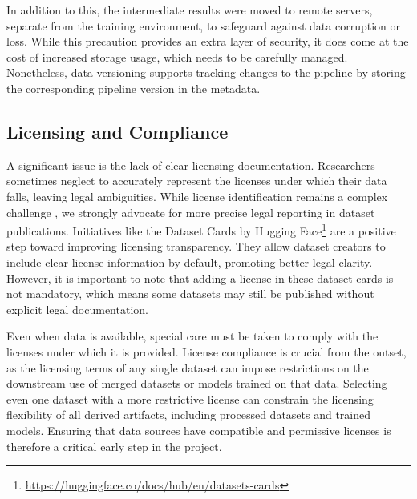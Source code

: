 In addition to this, the intermediate results were moved 
to remote servers, separate from the training environment, to safeguard 
against data corruption or loss. While this precaution provides an extra 
layer of security, it does come at the cost of increased storage usage, 
which needs to be carefully managed. Nonetheless, data versioning supports tracking changes to the pipeline by storing the corresponding pipeline version in the metadata.

\subsection{Licensing and Compliance}
\label{sec:insights.license}
A significant issue is the lack of clear licensing documentation. 
Researchers sometimes neglect to accurately represent the licenses under which their data falls, leaving legal ambiguities. While license identification remains a complex challenge \cite{SeneviratneKB09,HabernalZG16}, we strongly advocate for more precise legal reporting in dataset publications. Initiatives like the Dataset Cards by Hugging Face\footnote{\url{https://huggingface.co/docs/hub/en/datasets-cards}} are a positive step toward improving licensing transparency. They allow dataset creators to include clear license information by default, promoting better legal clarity. However, it is important to note that adding a license in these dataset cards is not mandatory, which means some datasets may still be published without explicit legal documentation. 

Even when data is available, special care must be taken to comply with the 
licenses under which it is provided. License compliance is crucial from the 
outset, as the licensing terms of any single dataset can impose restrictions 
on the downstream use of merged datasets or models trained on that data. 
Selecting even one dataset with a more restrictive license can constrain 
the licensing flexibility of all derived artifacts, including processed 
datasets and trained models. Ensuring that data sources have compatible and 
permissive licenses is therefore a critical early step in the project.


